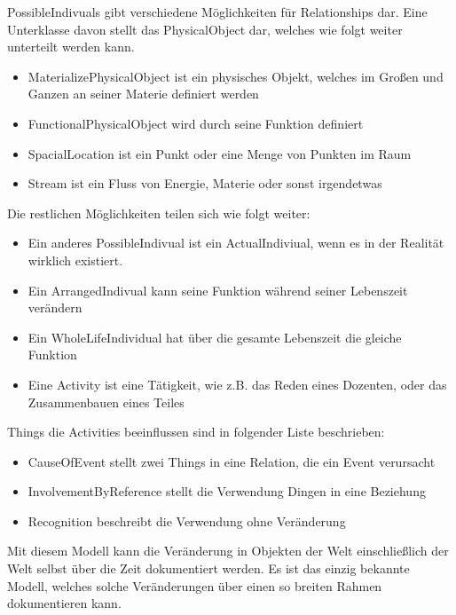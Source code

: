 PossibleIndivuals gibt verschiedene Möglichkeiten für Relationships dar. Eine Unterklasse davon stellt das PhysicalObject dar, welches wie folgt weiter unterteilt werden kann.

\begin{itemize}
\item MaterializePhysicalObject ist ein physisches Objekt, welches im Großen und Ganzen an seiner Materie definiert werden
\item FunctionalPhysicalObject wird durch seine Funktion definiert
\item SpacialLocation ist ein Punkt oder eine Menge von Punkten im Raum
\item Stream ist ein Fluss von Energie, Materie oder sonst irgendetwas
\end{itemize}

Die restlichen Möglichkeiten teilen sich wie folgt weiter:

\begin{itemize}
\item Ein anderes PossibleIndivual ist ein ActualIndiviual, wenn es in der Realität wirklich existiert.
\item Ein ArrangedIndivual kann seine Funktion während seiner Lebenszeit verändern
\item Ein WholeLifeIndividual hat über die gesamte Lebenszeit die gleiche Funktion
\item Eine Activity ist eine Tätigkeit, wie z.B. das Reden eines Dozenten, oder das Zusammenbauen eines Teiles
\end{itemize}

Things die Activities beeinflussen sind in folgender Liste beschrieben:

\begin{itemize}
\item CauseOfEvent stellt zwei Things in eine Relation, die ein Event verursacht
\item InvolvementByReference stellt die Verwendung Dingen in eine Beziehung
\item Recognition beschreibt die Verwendung ohne Veränderung
\end{itemize}

Mit diesem Modell kann die Veränderung in Objekten der Welt einschließlich der Welt selbst über die Zeit dokumentiert werden. Es ist das einzig bekannte Modell, welches solche Veränderungen über einen so breiten Rahmen dokumentieren kann.

